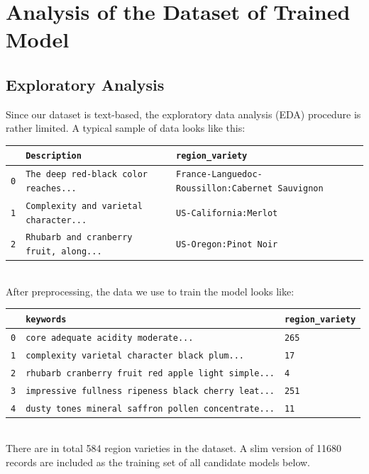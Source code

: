 \documentclass[
]{kaohandt}
\begin{document}
\section{Analysis of the Dataset of Trained Model}

\subsection*{Exploratory Analysis}

Since our dataset is text-based, the exploratory data analysis (EDA) procedure is rather limited. A typical sample of data looks like this: \\

\begin{tabular}{lll} \toprule
	\texttt{} & \texttt{Description} & \texttt{region\_variety}  \\ \midrule
	\texttt{0} & \texttt{The deep red-black color reaches...} & \texttt{France-Languedoc-Roussillon:Cabernet Sauvignon}  \\
	\texttt{1} & \texttt{Complexity and varietal character...} & \texttt{US-California:Merlot} \\
	\texttt{2} & \texttt{Rhubarb and cranberry fruit, along...} & \texttt{US-Oregon:Pinot Noir} \\ \bottomrule
\end{tabular}\\

After preprocessing, the data we use to train the model looks like: \\

\begin{tabular}{lll} \toprule
	\texttt{} & \texttt{keywords} & \texttt{region\_variety}  \\ \midrule
	\texttt{0} & \texttt{core adequate acidity moderate...} & \texttt{265}  \\
	\texttt{1} & \texttt{complexity varietal character black plum...} & \texttt{17} \\
	\texttt{2} & \texttt{rhubarb cranberry fruit red apple light simple...} & \texttt{4} \\
	\texttt{3} & \texttt{impressive fullness ripeness black cherry leat...} & \texttt{251} \\
	\texttt{4} & \texttt{dusty tones mineral saffron pollen concentrate...} & \texttt{11} \\ \bottomrule
\end{tabular}\\

There are in total 584 region varieties in the dataset. A slim version of 11680 records are included as the training set of all candidate models below.
\end{document}
